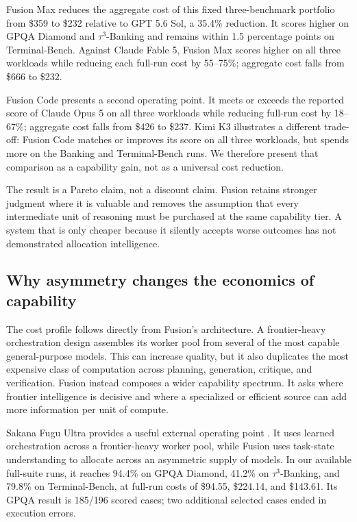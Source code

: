 Fusion Max reduces the aggregate cost of this fixed three-benchmark portfolio
from \$359 to \$232 relative to GPT 5.6 Sol, a 35.4\% reduction. It scores
higher on GPQA Diamond and $\tau^3$-Banking and remains within 1.5 percentage
points on Terminal-Bench. Against Claude Fable 5, Fusion Max scores higher on
all three workloads while reducing each full-run cost by 55--75\%; aggregate
cost falls from \$666 to \$232.

Fusion Code presents a second operating point. It meets or exceeds the reported
score of Claude Opus 5 on all three workloads while reducing full-run cost by
18--67\%; aggregate cost falls from \$426 to \$237. Kimi K3 illustrates a
different trade-off: Fusion Code matches or improves its score on all three
workloads, but spends more on the Banking and Terminal-Bench runs. We therefore
present that comparison as a capability gain, not as a universal cost
reduction.

The result is a Pareto claim, not a discount claim. Fusion retains stronger
judgment where it is valuable and removes the assumption that every
intermediate unit of reasoning must be purchased at the same capability tier.
A system that is only cheaper because it silently accepts worse outcomes has
not demonstrated allocation intelligence.

\subsection{Why asymmetry changes the economics of capability}

The cost profile follows directly from Fusion's architecture. A frontier-heavy
orchestration design assembles its worker pool from several of the most capable
general-purpose models. This can increase quality, but it also duplicates the
most expensive class of computation across planning, generation, critique, and
verification. Fusion instead composes a wider capability spectrum. It asks
where frontier intelligence is decisive and where a specialized or efficient
source can add more information per unit of compute.

Sakana Fugu Ultra provides a useful external operating point
\citep{fugu2026}. It uses learned orchestration across a frontier-heavy worker
pool, while Fusion uses task-state understanding to allocate across an
asymmetric supply of models. In our available full-suite runs, it reaches
94.4\% on GPQA Diamond, 41.2\% on
$\tau^3$-Banking, and 79.8\% on Terminal-Bench, at full-run costs of \$94.55,
\$224.14, and \$143.61. Its GPQA result is 185/196 scored cases; two additional
selected cases ended in execution errors.

